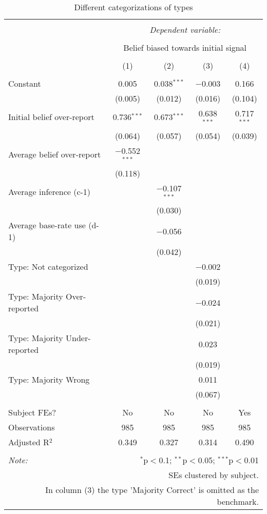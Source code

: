
\begin{table}[!htbp] \centering 
  \caption{Different categorizations of types} 
  \label{tab:retractions_types} 
\begin{tabular}{@{\extracolsep{5pt}}lcccc} 
\\[-1.8ex]\hline 
\hline \\[-1.8ex] 
 & \multicolumn{4}{c}{\textit{Dependent variable:}} \\ 
\cline{2-5} 
\\[-1.8ex] & \multicolumn{4}{c}{Belief biased towards initial signal} \\ 
\\[-1.8ex] & (1) & (2) & (3) & (4)\\ 
\hline \\[-1.8ex] 
 Constant & 0.005 & 0.038$^{***}$ & $-$0.003 & 0.166 \\ 
  & (0.005) & (0.012) & (0.016) & (0.104) \\ 
  Initial belief over-report & 0.736$^{***}$ & 0.673$^{***}$ & 0.638$^{***}$ & 0.717$^{***}$ \\ 
  & (0.064) & (0.057) & (0.054) & (0.039) \\ 
  Average belief over-report & $-$0.552$^{***}$ &  &  &  \\ 
  & (0.118) &  &  &  \\ 
  Average inference (c-1) &  & $-$0.107$^{***}$ &  &  \\ 
  &  & (0.030) &  &  \\ 
  Average base-rate use (d-1) &  & $-$0.056 &  &  \\ 
  &  & (0.042) &  &  \\ 
  Type: Not categorized &  &  & $-$0.002 &  \\ 
  &  &  & (0.019) &  \\ 
  Type: Majority Over-reported &  &  & $-$0.024 &  \\ 
  &  &  & (0.021) &  \\ 
  Type: Majority Under-reported &  &  & 0.023 &  \\ 
  &  &  & (0.019) &  \\ 
  Type: Majority Wrong &  &  & 0.011 &  \\ 
  &  &  & (0.067) &  \\ 
 \hline \\[-1.8ex] 
Subject FEs? & No & No & No & Yes \\ 
Observations & 985 & 985 & 985 & 985 \\ 
Adjusted R$^{2}$ & 0.349 & 0.327 & 0.314 & 0.490 \\ 
\hline 
\hline \\[-1.8ex] 
\textit{Note:}  & \multicolumn{4}{r}{$^{*}$p$<$0.1; $^{**}$p$<$0.05; $^{***}$p$<$0.01} \\ 
 & \multicolumn{4}{r}{SEs clustered by subject.} \\ 
 \multicolumn{5}{r}{In column (3) the type 'Majority Correct' is omitted as the benchmark.} \\ 
\end{tabular} 
\end{table} 


